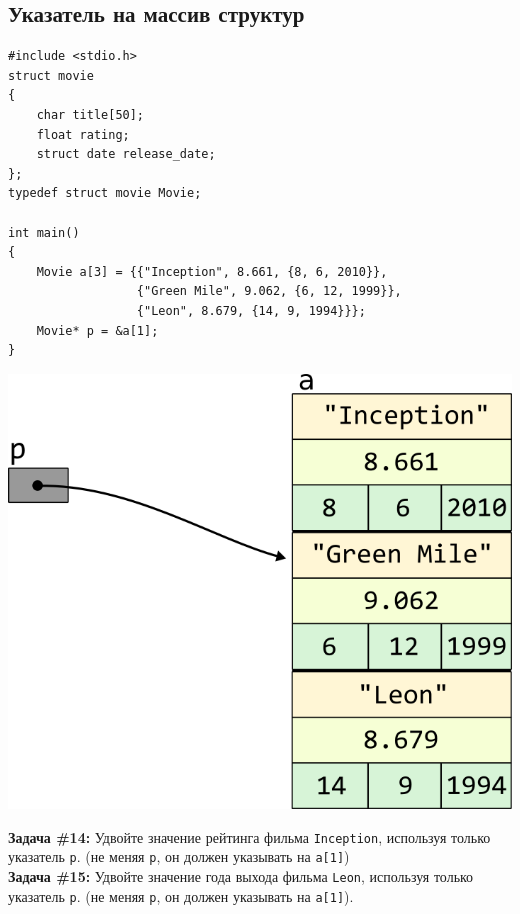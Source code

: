 \documentclass{article}
\begin{document}
\subsection*{Указатель на массив структур}
\begin{lstlisting}
#include <stdio.h>
struct movie
{
	char title[50];
	float rating;
	struct date release_date;
};
typedef struct movie Movie;

int main()
{
	Movie a[3] = {{"Inception", 8.661, {8, 6, 2010}}, 
	              {"Green Mile", 9.062, {6, 12, 1999}}, 
	              {"Leon", 8.679, {14, 9, 1994}}};
	Movie* p = &a[1];
}
\end{lstlisting}

\vspace{-59ex}
\begin{center}
\quad\quad\quad\quad\quad\quad\quad\quad\quad\quad\quad\quad\quad\quad\quad\quad\quad\quad\quad\quad\quad\quad\quad
\includegraphics[scale=1]{../images/pointer_schemes/pointer_to_array_of_struct_movie.png}
\end{center}
\textbf{Задача \#14:} Удвойте значение рейтинга фильма \texttt{Inception}, используя только указатель \texttt{p}. (не меняя \texttt{p}, он должен указывать на \texttt{a[1]})\\
\textbf{Задача \#15:} Удвойте значение года выхода фильма \texttt{Leon}, используя только указатель \texttt{p}. (не меняя \texttt{p}, он должен указывать на \texttt{a[1]}).\\
\end{document}
